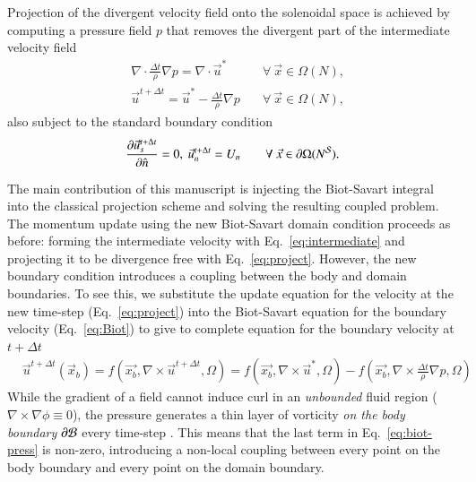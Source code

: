 \documentclass[final,1p,times]{elsarticle}
\begin{document}
Projection of the divergent velocity field onto the solenoidal space is achieved by computing a pressure field $p$ that removes the divergent part of the intermediate velocity field
\begin{align}\label{eq:poisson}
      &\nabla\cdot\frac{\Delta t}{\rho}\nabla p = \nabla\cdot \vec{u}^* &\quad\forall\ \vec{x}\in\Omega (N),\\
      \label{eq:project}
      &\vec{u}^{t+\Delta t} = \vec{u}^*-\frac{\Delta t}{\rho}\nabla p &\quad\forall\ \vec{x}\in\Omega (N),
\end{align}
also subject to the standard boundary condition
\begin{align}\label{eq:BC_2}
      &\frac{\partial \vec{u}^{t+\Delta t}_s}{\partial \hat{n}} = 0,\ \vec{u}^{t+\Delta t}_n = U_n &\quad\forall\ \vec{x}\in\partial\Omega (N^{\cal S}).
\end{align}

The main contribution of this manuscript is injecting the Biot-Savart integral into the classical projection scheme and solving the resulting coupled problem. The momentum update using the new Biot-Savart domain condition proceeds as before: forming the intermediate velocity with Eq.~\ref{eq:intermediate} and projecting it to be divergence free with Eq.~\ref{eq:project}. However, the new boundary condition introduces a coupling between the body and domain boundaries. To see this, we substitute the update equation for the velocity at the new time-step (Eq.~\ref{eq:project}) into the Biot-Savart equation for the boundary velocity (Eq.~\ref{eq:Biot}) to give to complete equation for the boundary velocity at $t+\Delta t$
\begin{align}\label{eq:biot-press}
    &\vec{u}^{t+\Delta t}(\vec x_b) = f(\vec{x_b},\nabla\times \vec{u}^{t+\Delta t},\Omega) = f(\vec{x_b},\nabla\times\vec{u}^*,\Omega)-f\left(\vec{x_b},\nabla\times\frac{\Delta t}{\rho}\nabla p,\Omega\right) 
\end{align}
While the gradient of a field cannot induce curl in an \textit{unbounded} fluid region ($\nabla\times\nabla\phi\equiv 0$), the pressure generates a thin layer of vorticity \textit{on the body boundary} $\partial\cal B$ every time-step \cite{Morton1984GeophysicalTy}. This means that the last term in Eq.~\ref{eq:biot-press} is non-zero, introducing a non-local coupling between every point on the body boundary and every point on the domain boundary.
\end{document}
